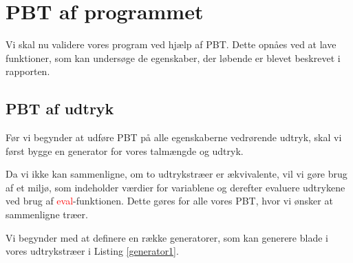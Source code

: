 \section{PBT af programmet}
Vi skal nu validere vores program ved hjælp af PBT. Dette opnåes ved at lave funktioner, som kan undersøge de egenskaber, der løbende er blevet beskrevet i rapporten. 

\subsection{PBT af udtryk}
Før vi begynder at udføre PBT på alle egenskaberne vedrørende udtryk, skal vi først bygge en generator for vores talmængde og udtryk.

Da vi ikke kan sammenligne, om to udtrykstræer er ækvivalente, vil vi gøre brug af et miljø, som indeholder værdier for variablene og derefter evaluere udtrykene ved brug af \textcolor{red}{eval}-funktionen. Dette gøres for alle vores PBT, hvor vi ønsker at sammenligne træer.

Vi begynder med at definere en række generatorer, som kan generere blade i vores udtrykstræer i Listing \ref{generator1}.


